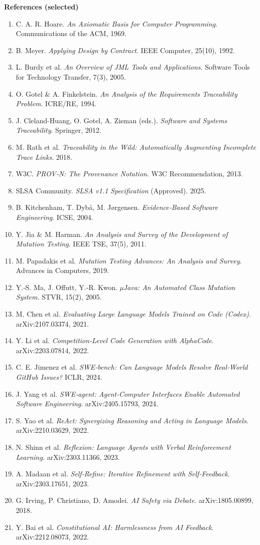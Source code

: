 \documentclass[11pt]{article}
\begin{document}
\textbf{References (selected)}  
\begin{enumerate}
\item C. A. R. Hoare. \textit{An Axiomatic Basis for Computer Programming}. Communications of the ACM, 1969.  
\item B. Meyer. \textit{Applying Design by Contract}. IEEE Computer, 25(10), 1992.  
\item L. Burdy et al. \textit{An Overview of JML Tools and Applications}. Software Tools for Technology Transfer, 7(3), 2005.  
\item O. Gotel \& A. Finkelstein. \textit{An Analysis of the Requirements Traceability Problem}. ICRE/RE, 1994.  
\item J. Cleland-Huang, O. Gotel, A. Zisman (eds.). \textit{Software and Systems Traceability}. Springer, 2012.  
\item M. Rath et al. \textit{Traceability in the Wild: Automatically Augmenting Incomplete Trace Links}. 2018.  
\item W3C. \textit{PROV‑N: The Provenance Notation}. W3C Recommendation, 2013.  
\item SLSA Community. \textit{SLSA v1.1 Specification} (Approved). 2025.  
\item B. Kitchenham, T. Dybå, M. Jørgensen. \textit{Evidence‑Based Software Engineering}. ICSE, 2004.  
\item Y. Jia \& M. Harman. \textit{An Analysis and Survey of the Development of Mutation Testing}. IEEE TSE, 37(5), 2011.  
\item M. Papadakis et al. \textit{Mutation Testing Advances: An Analysis and Survey}. Advances in Computers, 2019.  
\item Y.‑S. Ma, J. Offutt, Y.‑R. Kwon. \textit{µJava: An Automated Class Mutation System}. STVR, 15(2), 2005.  
\item M. Chen et al. \textit{Evaluating Large Language Models Trained on Code (Codex)}. arXiv:2107.03374, 2021.  
\item Y. Li et al. \textit{Competition‑Level Code Generation with AlphaCode}. arXiv:2203.07814, 2022.  
\item C. E. Jimenez et al. \textit{SWE‑bench: Can Language Models Resolve Real‑World GitHub Issues?} ICLR, 2024.  
\item J. Yang et al. \textit{SWE‑agent: Agent‑Computer Interfaces Enable Automated Software Engineering}. arXiv:2405.15793, 2024.  
\item S. Yao et al. \textit{ReAct: Synergizing Reasoning and Acting in Language Models}. arXiv:2210.03629, 2022.  
\item N. Shinn et al. \textit{Reflexion: Language Agents with Verbal Reinforcement Learning}. arXiv:2303.11366, 2023.  
\item A. Madaan et al. \textit{Self‑Refine: Iterative Refinement with Self‑Feedback}. arXiv:2303.17651, 2023.  
\item G. Irving, P. Christiano, D. Amodei. \textit{AI Safety via Debate}. arXiv:1805.00899, 2018.  
\item Y. Bai et al. \textit{Constitutional AI: Harmlessness from AI Feedback}. arXiv:2212.08073, 2022.  
\end{enumerate}
\end{document}
